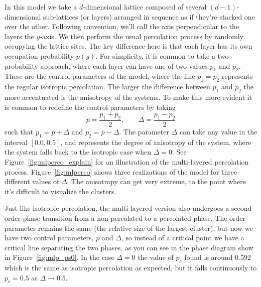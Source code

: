 In this model we take a $d$-dimensional lattice composed of several
$(d-1)$-dimensional sub-lattices (or layers) arranged in sequence as if they're
stacked one over the other. Following convention, we'll call the axis
perpendicular to the layers the $y$-axis. We then perform the usual percolation
process by randomly occupying the lattice sites. The key difference here is
that each layer has its own occupation probability $p(y)$. For simplicity, it
is common to take a two-probability approach, where each layer can have one of
two values $p_1$ and $p_2$. These are the control parameters of the model,
where the line $p_1=p_2$ represents the regular isotropic percolation. The
larger the difference between $p_1$ and $p_2$ the more accentuated is the
anisotropy of the systems. To make this more evident it is common to redefine
the control parameters by taking
\begin{equation}
    \bar{p}=\frac{p_1 + p_2}{2},\;\;\;\;\;\;\;\Delta=\frac{p_1 - p_2}{2}
\end{equation}
such that $p_1 = \bar{p} + \Delta$ and $p_2 = \bar{p} - \Delta$. The parameter
$\Delta$ can take any value in the interval $[0.0,0.5]$, and represents the
degree of anisotropy of the system, where the system falls back to the
isotropic case when $\Delta=0$. See Figure~\ref{fig:mlperco_explain} for an
illustration of the multi-layered percolation process. Figure~\ref{fig:mlperco}
shows three realizations of the model for three different values of $\Delta$.
The anisotropy can get very extreme, to the point where it's difficult to
visualize the clusters. 

Just like isotropic percolation, the multi-layered version also undergoes a
second-order phase transition from a non-percolated to a percolated phase. The
order parameter  remains the same (the relative size of the largest cluster),
but now we have two control parameters, $p$ and $\Delta$, so instead of a
critical point we have a critical line separating the two phases, as you can
see in the phase diagram show in Figure~\ref{fig:mlp_ps0}. In the case
$\Delta=0$ the value of $p_c$ found is around $0.592$ which is the same as
isotropic percolation as expected, but it falls continuously to $p_c=0.5$ as
$\Delta\rightarrow 0.5$.

